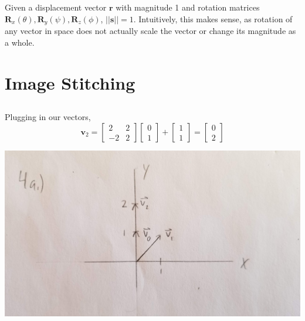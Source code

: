 \documentclass[]{article}
\begin{document}
\subsection{}

Given a displacement vector \(\mathbf{r}\) with magnitude 1 and rotation matrices \(\mathbf{R}_x(\theta), \mathbf{R}_y(\psi), \mathbf{R}_z(\phi)\), \(||\mathbf{s}|| = 1\). Intuitively, this makes sense, as rotation of any vector in space does not actually scale the vector or change its magnitude as a whole. 

\section{Image Stitching}

\subsection{}

Plugging in our vectors,  
\begin{equation}
	\mathbf{v}_2
	=
	\begin{bmatrix}
	2 & 2 \\
	-2 & 2
	\end{bmatrix}
	\begin{bmatrix}
	0 \\
	1
	\end{bmatrix}
	+
	\begin{bmatrix}
	1 \\
	1
	\end{bmatrix} = 
	\begin{bmatrix}
	0 \\
	2
	\end{bmatrix}
\end{equation}

\begin{center}
	\includegraphics[width=0.7\linewidth]{20190920_153756}
\end{center}

\subsection{}
\end{document}
